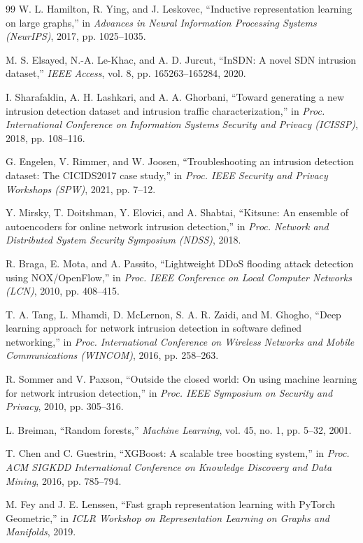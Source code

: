 \begin{thebibliography}{99}
 W. L. Hamilton, R. Ying, and J. Leskovec, ``Inductive representation learning on large graphs,'' in \textit{Advances in Neural Information Processing Systems (NeurIPS)}, 2017, pp. 1025--1035.

 M. S. Elsayed, N.-A. Le-Khac, and A. D. Jurcut, ``InSDN: A novel SDN intrusion dataset,'' \textit{IEEE Access}, vol. 8, pp. 165263--165284, 2020.

 I. Sharafaldin, A. H. Lashkari, and A. A. Ghorbani, ``Toward generating a new intrusion detection dataset and intrusion traffic characterization,'' in \textit{Proc. International Conference on Information Systems Security and Privacy (ICISSP)}, 2018, pp. 108--116.

 G. Engelen, V. Rimmer, and W. Joosen, ``Troubleshooting an intrusion detection dataset: The CICIDS2017 case study,'' in \textit{Proc. IEEE Security and Privacy Workshops (SPW)}, 2021, pp. 7--12.

 Y. Mirsky, T. Doitshman, Y. Elovici, and A. Shabtai, ``Kitsune: An ensemble of autoencoders for online network intrusion detection,'' in \textit{Proc. Network and Distributed System Security Symposium (NDSS)}, 2018.

 R. Braga, E. Mota, and A. Passito, ``Lightweight DDoS flooding attack detection using NOX/OpenFlow,'' in \textit{Proc. IEEE Conference on Local Computer Networks (LCN)}, 2010, pp. 408--415.

 T. A. Tang, L. Mhamdi, D. McLernon, S. A. R. Zaidi, and M. Ghogho, ``Deep learning approach for network intrusion detection in software defined networking,'' in \textit{Proc. International Conference on Wireless Networks and Mobile Communications (WINCOM)}, 2016, pp. 258--263.

 R. Sommer and V. Paxson, ``Outside the closed world: On using machine learning for network intrusion detection,'' in \textit{Proc. IEEE Symposium on Security and Privacy}, 2010, pp. 305--316.

 L. Breiman, ``Random forests,'' \textit{Machine Learning}, vol. 45, no. 1, pp. 5--32, 2001.

 T. Chen and C. Guestrin, ``XGBoost: A scalable tree boosting system,'' in \textit{Proc. ACM SIGKDD International Conference on Knowledge Discovery and Data Mining}, 2016, pp. 785--794.

 M. Fey and J. E. Lenssen, ``Fast graph representation learning with PyTorch Geometric,'' in \textit{ICLR Workshop on Representation Learning on Graphs and Manifolds}, 2019.


\end{thebibliography}
